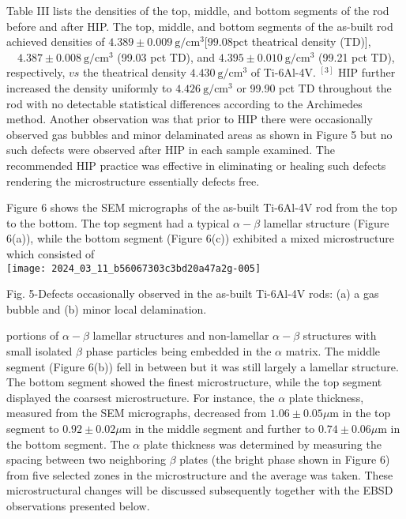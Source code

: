 \documentclass[10pt]{article}
\begin{document}
Table III lists the densities of the top, middle, and bottom segments of the rod before and after HIP. The top, middle, and bottom segments of the as-built rod achieved densities of $4.389 \pm 0.009 \mathrm{~g} / \mathrm{cm}^{3}[99.08 \mathrm{pct}$ theatrical density (TD)], $\quad 4.387 \pm 0.008 \mathrm{~g} / \mathrm{cm}^{3}$ (99.03 pct TD), and $4.395 \pm 0.010 \mathrm{~g} / \mathrm{cm}^{3}$ (99.21 pct TD), respectively, $v s$ the theatrical density $4.430 \mathrm{~g} / \mathrm{cm}^{3}$ of Ti-6Al-4V. ${ }^{[3]}$ HIP further increased the density uniformly to $4.426 \mathrm{~g} / \mathrm{cm}^{3}$ or 99.90 pct TD throughout the rod with no detectable statistical differences according to the Archimedes method. Another observation was that prior to HIP there were occasionally observed gas bubbles and minor delaminated areas as shown in Figure 5 but no such defects were observed after HIP in each sample examined. The recommended HIP practice was effective in eliminating or healing such defects rendering the microstructure essentially defects free.

Figure 6 shows the SEM micrographs of the as-built Ti-6Al-4V rod from the top to the bottom. The top segment had a typical $\alpha-\beta$ lamellar structure (Figure 6(a)), while the bottom segment (Figure 6(c)) exhibited a mixed microstructure which consisted of\\
\texttt{[image: 2024\_03\_11\_b56067303c3bd20a47a2g-005]}

Fig. 5-Defects occasionally observed in the as-built Ti-6Al-4V rods: (a) a gas bubble and (b) minor local delamination.

portions of $\alpha-\beta$ lamellar structures and non-lamellar $\alpha-\beta$ structures with small isolated $\beta$ phase particles being embedded in the $\alpha$ matrix. The middle segment (Figure 6(b)) fell in between but it was still largely a lamellar structure. The bottom segment showed the finest microstructure, while the top segment displayed the coarsest microstructure. For instance, the $\alpha$ plate thickness, measured from the SEM micrographs, decreased from $1.06 \pm 0.05 \mu \mathrm{m}$ in the top segment to $0.92 \pm 0.02 \mu \mathrm{m}$ in the middle segment and further to $0.74 \pm 0.06 \mu \mathrm{m}$ in the bottom segment. The $\alpha$ plate thickness was determined by measuring the spacing between two neighboring $\beta$ plates (the bright phase shown in Figure 6) from five selected zones in the microstructure and the average was taken. These microstructural changes will be discussed subsequently together with the EBSD observations presented below.
\end{document}
